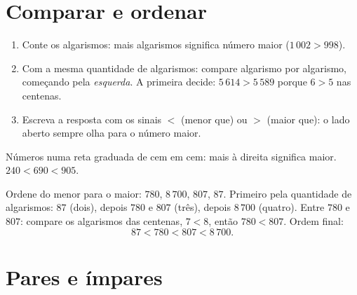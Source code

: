 \section{Comparar e ordenar}

\begin{method}\label{met:g3:numbers:compare}
\begin{enumerate}
  \item Conte os algarismos: mais algarismos significa número maior
        ($1\,002 > 998$).
  \item Com a mesma quantidade de algarismos: compare algarismo por
        algarismo, começando pela \emph{esquerda}. A primeira
         decide: $5\,614 > 5\,589$ porque $6 > 5$ nas
        centenas.
  \item Escreva a resposta com os sinais $<$ (menor que) ou $>$
        (maior que): o lado aberto sempre olha para o número maior.
\end{enumerate}
\end{method}

\begin{omfigure}

{\small Números numa reta graduada de cem em cem: mais à direita
significa maior. $240 < 690 < 905$.}
\end{omfigure}

\begin{example}\label{ex:g3:numbers:order}
Ordene do menor para o maior: $780$, $8\,700$, $807$, $87$. Primeiro
pela quantidade de algarismos: $87$ (dois), depois $780$ e $807$
(três), depois $8\,700$ (quatro). Entre $780$ e $807$: compare os
algarismos das centenas, $7 < 8$, então $780 < 807$. Ordem final:
\[
87 < 780 < 807 < 8\,700 .
\]
\end{example}

\section{Pares e ímpares}

